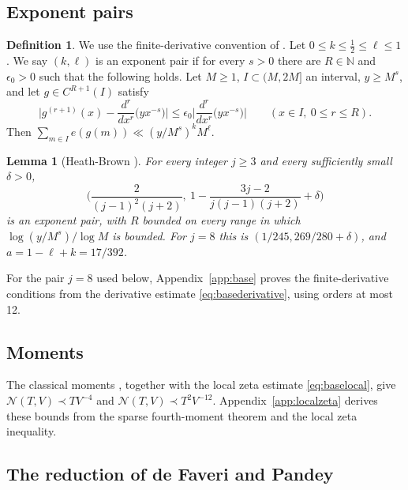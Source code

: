 \documentclass[11pt]{amsart}
\newtheorem{lemma}[theorem]{Lemma}
\theoremstyle{definition}
\newtheorem{definition}[theorem]{Definition}
\theoremstyle{remark}
\numberwithin{equation}{section}
\newcommand{\cN}{\mathcal{N}}
\begin{document}
\subsection{Exponent pairs}

\begin{definition}\label{def:pair}
We use the finite-derivative convention of \cite[\S1.1]{TY}.
Let $0\le k\le\frac12\le\ell\le1$. We say $(k,\ell)$ is an exponent pair if for every $s>0$ there are $R\in\mathbb N$ and $\epsilon_0>0$ such that the following holds. Let $M\ge1$, $I\subset(M,2M]$ an interval, $y\ge M^s$, and let $g\in C^{R+1}(I)$ satisfy
\[
\Big|g^{(r+1)}(x)-\frac{d^r}{dx^r}\big(yx^{-s}\big)\Big|\le\epsilon_0\Big|\frac{d^r}{dx^r}\big(yx^{-s}\big)\Big|
\qquad(x\in I,\ 0\le r\le R).
\]
Then $\sum_{m\in I}e(g(m))\ll (y/M^{s})^{k}M^{\ell}$.
\end{definition}

\begin{lemma}[Heath-Brown {\cite[Theorem~2]{HB17}}]\label{lem:hb}
For every integer $j\ge3$ and every sufficiently small $\delta>0$,
\[
\Big(\frac2{(j-1)^2(j+2)},\ 1-\frac{3j-2}{j(j-1)(j+2)}+\delta\Big)
\]
is an exponent pair, with $R$ bounded on every range in which $\log(y/M^{s})/\log M$ is bounded. For $j=8$ this is $(1/245,269/280+\delta)$, and $a=1-\ell+k=17/392$.
\end{lemma}
For the pair $j=8$ used below, Appendix~\ref{app:base} proves the
finite-derivative conditions from the derivative estimate
\eqref{eq:basederivative}, using orders at most 12.

\subsection{Moments}
The classical moments \cite{Ing26,HB78}, together with the local zeta estimate \eqref{eq:baselocal}, give $\cN(T,V)\prec TV^{-4}$ and $\cN(T,V)\prec T^2V^{-12}$. Appendix~\ref{app:localzeta} derives these bounds from the sparse fourth-moment theorem and the local zeta inequality.

\subsection{The reduction of de Faveri and Pandey}
\end{document}
